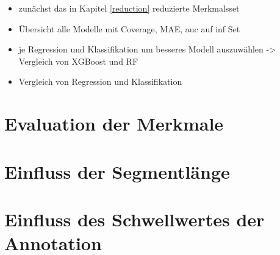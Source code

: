 	\begin{itemize}
		\item zunächst das in Kapitel \ref{reduction} reduzierte Merkmalsset
		\item Übersicht alle Modelle mit Coverage, MAE, auc auf inf Set
		\item je Regression und Klassifikation um besseres Modell auszuwählen -> Vergleich von XGBoost und RF
		\item Vergleich von Regression und Klassifikation
	\end{itemize}
	
	\section{Evaluation der Merkmale}

	\section{Einfluss der Segmentlänge}

	\section{Einfluss des Schwellwertes der Annotation}